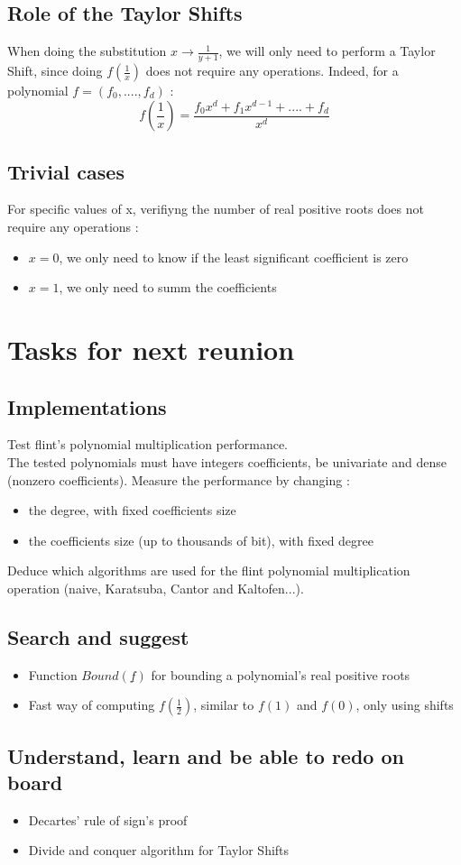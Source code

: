 \documentclass[a4paper,12pt]{article}
\begin{document}
\subsection*{Role of the Taylor Shifts}
When doing the substitution \(x \rightarrow \frac{1}{y+1}\), we will only need to perform a Taylor Shift, since doing \(f(\frac{1}{x})\) does not require any operations. Indeed, for a polynomial \(f = (f_0,....,f_d)\) :
\[
  f(\frac{1}{x}) = \frac{f_0x^d + f_1x^{d-1} + .... + f_d}{x^d}
\]

\subsection*{Trivial cases}
For specific values of x, verifiyng the number of real positive roots does not require any operations :
\begin{itemize}
  \item \(x = 0\), we only need to know if the least significant coefficient is zero
  \item \(x= 1\), we only need to summ the coefficients
\end{itemize}

\section{Tasks for next reunion}

\subsection*{Implementations}
Test flint's polynomial multiplication performance.\\
The tested polynomials must have integers coefficients, be univariate and dense (nonzero coefficients).
Measure the performance by changing :
\begin{itemize}
    \item the degree, with fixed coefficients size
    \item the coefficients size (up to thousands of bit), with fixed degree
\end{itemize}
Deduce which algorithms are used for the flint polynomial multiplication operation (naive, Karatsuba, Cantor and Kaltofen...).

\subsection*{Search and suggest}
\begin{itemize}
  \item Function \(Bound(\underline{f})\) for bounding a polynomial's real positive roots
  \item Fast way of computing \(f(\frac{1}{2})\), similar to \(f(1)\) and \(f(0)\), only using shifts
\end{itemize}

\subsection*{Understand, learn and be able to redo on board}
\begin{itemize}
    \item Decartes' rule of sign's proof
    \item Divide and conquer algorithm for Taylor Shifts
\end{itemize}
\end{document}
